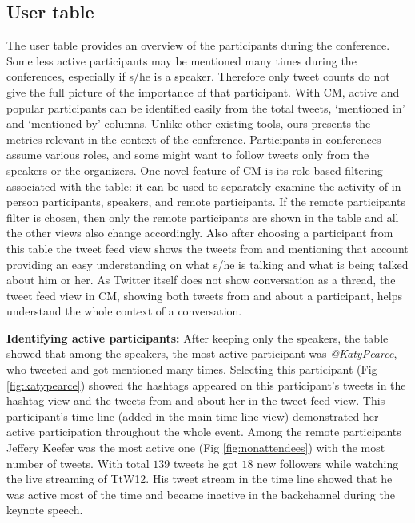 \documentclass[conference,final]{IEEEtran}
\begin{document}
\subsection{User table}
The user table provides an overview of the participants during the conference. Some less active participants may be mentioned many times during the conferences, especially if s/he is a speaker. Therefore only tweet counts do not give the full picture of the importance of that participant. With CM, active and popular participants can be identified easily from the total tweets, `mentioned in' and `mentioned by' columns. Unlike other existing tools, ours presents the metrics relevant in the context of the conference. Participants in conferences assume various roles, and some might want to follow tweets only from the speakers or the organizers. One novel feature of CM is its role-based filtering associated with the table: it can be used to separately examine the activity of in-person participants, speakers, and remote participants. If the remote participants filter is chosen, then only the remote participants are shown in the table and all the other views also change accordingly. Also after choosing a participant from this table the tweet feed view shows the tweets from and mentioning that account providing an easy understanding on what s/he is talking and what is being talked about him or her. As Twitter itself does not show conversation as a thread, the tweet feed view in CM, showing both tweets from and about a participant, helps understand the whole context of a conversation.

\textbf{Identifying active participants:}
After keeping only the speakers, the table showed that among the speakers, the most active participant was \textit{@KatyPearce}, who tweeted and got mentioned many times. Selecting this participant (Fig \ref{fig:katypearce}) showed the hashtags appeared on this participant's tweets in the hashtag view and the tweets from and about her in the tweet feed view. This participant's time line (added in the main time line view) demonstrated her active participation throughout the whole event. 
Among the remote participants Jeffery Keefer was the most active one (Fig \ref{fig:nonattendees}) with the most number of tweets. With total $139$ tweets he got $18$ new followers while watching the live streaming of TtW12. His tweet stream in the time line showed that he was active most of the time and became inactive in the backchannel during the keynote speech.
\end{document}
